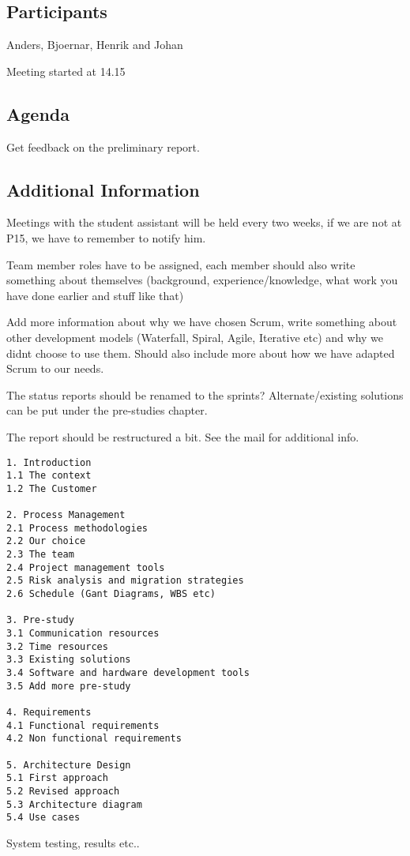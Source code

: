 \subsection{Participants} 
Anders, Bjoernar, Henrik and Johan

Meeting started at 14.15

\subsection{Agenda}
Get feedback on the preliminary report.

\subsection{Additional Information}
Meetings with the student assistant will be held every two weeks, if we are not at P15, we have to remember to notify him. 

Team member roles have to be assigned, each member should also write something about themselves (background, experience/knowledge, 
what work you have done earlier and stuff like that)

Add more information about why we have chosen Scrum, write something about other development models (Waterfall, Spiral, Agile, Iterative etc) 
and why we didnt choose to use them. Should also include more about how we have adapted Scrum to our needs.


The status reports should be renamed to the sprints?
Alternate/existing solutions can be put under the pre-studies chapter.

The report should be restructured a bit. See the mail for additional info.

\begin{verbatim}
1. Introduction
1.1 The context
1.2 The Customer

2. Process Management
2.1 Process methodologies
2.2 Our choice
2.3 The team
2.4 Project management tools
2.5 Risk analysis and migration strategies
2.6 Schedule (Gant Diagrams, WBS etc)

3. Pre-study
3.1 Communication resources
3.2 Time resources
3.3 Existing solutions
3.4 Software and hardware development tools
3.5 Add more pre-study

4. Requirements
4.1 Functional requirements
4.2 Non functional requirements

5. Architecture Design
5.1 First approach
5.2 Revised approach
5.3 Architecture diagram
5.4 Use cases
\end{verbatim}

System testing, results etc..